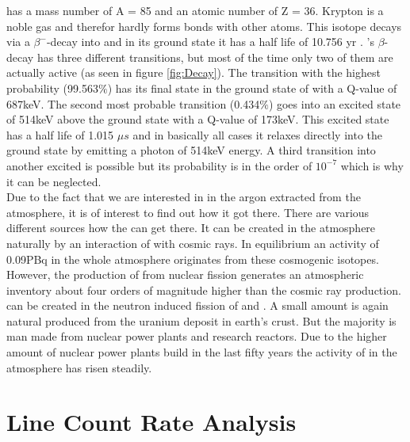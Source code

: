 \documentclass[encoding=utf8,british]{tumphthesis}
\begin{document}
\Kr has a mass number of A = 85 and an atomic number of Z = 36.
Krypton is a noble gas and therefor hardly forms bonds with other atoms.
This isotope decays via a $\beta^-$-decay into  and in its ground state it has a half life of 10.756 yr \cite{singh_nuclear_2014}.
\Kr's $\beta$-decay has three different transitions, but most of the time only two of them are actually active (as seen in figure \ref{fig:Decay}).
The transition with the highest probability (99.563$\%$) has its final state in the ground state of  with a Q-value of 687keV.
The second most probable transition (0.434$\%$) goes into an excited state of 514keV above the ground state with a Q-value of 173keV.
This excited state has a half life of 1.015 $\unit{\mu s}$ and in basically all cases it relaxes directly into the ground state by emitting a photon of 514keV energy. 
A third transition into another excited  is possible but its probability is in the order of $10^{-7}$ which is why it can be neglected. 
\\

Due to the fact that we are interested in \Kr in the argon extracted from the atmosphere, it is of interest to find out how it got there.
There are various different sources how the \Kr can get there.
It can be created in the atmosphere naturally by an interaction of  with cosmic rays.
In equilibrium an activity of 0.09PBq in the whole atmosphere originates from these cosmogenic isotopes.
However, the production of \Kr from nuclear fission generates an atmospheric inventory about four orders of magnitude higher than the cosmic ray production.
\Kr can be created in the neutron induced fission of  and .
A small amount is again natural produced from the uranium deposit in earth's crust.
But the majority is man made from nuclear power plants and research reactors.
Due to the higher amount of nuclear power plants build in the last fifty years the activity of \Kr in the atmosphere has risen steadily.





 
\chapter{Line Count Rate Analysis}
\label{sec:SAfrom514}
\end{document}
